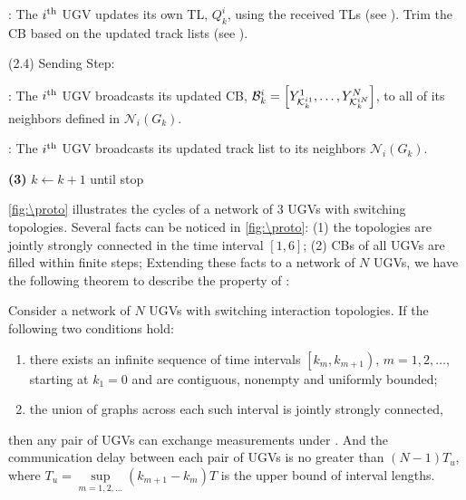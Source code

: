 \begin{algorithm}
\begin{algorithmic}
			\TL: The $i^\text{th}$ UGV updates its own TL, $Q^i_k$, using the received TLs (see ).
			Trim the CB based on the updated track lists (see ). 
			
			\State (2.4) Sending Step:
			
			\CB: The $i^\text{th}$ UGV broadcasts its updated CB, \small$\mathcal{B}^i_k=\left[Y^1_{\mathcal{K}^{i1}_{k}},\dots,Y^N_{\mathcal{K}^{iN}_{k}}\right]$\normalsize, to all of its neighbors defined in $\mathcal{N}_i(G_k)$.
			
			\TL: The $i^\text{th}$ UGV broadcasts its updated track list to its neighbors $\mathcal{N}_i(G_k)$.
			
			\State \textbf{(3)} $k\leftarrow k+1$ until stop
		\end{algorithmic}
	\end{algorithm}
	
	\cref{fig:\proto} illustrates the {\proto} cycles of a network of 3 UGVs with switching topologies.
	Several facts can be noticed in \cref{fig:\proto}: 
	(1) the topologies are jointly strongly connected in the time interval $\left[1,6\right]$;
	(2) CBs of all UGVs are filled within finite steps;
	Extending these facts to a network of $N$ UGVs, we have the following theorem to describe the property of \proto:
	
	\begin{thm}\label{prop1}
		Consider a network of $N$ UGVs with switching interaction topologies.
		If the following two conditions hold:
		\begin{enumerate}
			\item there exists an infinite sequence of time intervals $\left[k_m,k_{m+1} \right),\,m=1,2,\dots$, starting at $k_1=0$ and are contiguous, nonempty and uniformly bounded;
			\item the union of graphs across each such interval is jointly strongly connected,
		\end{enumerate}
		then any pair of UGVs can exchange measurements under \proto. And the communication delay between each pair of UGVs is no greater than \small$(N-1)T_u$\normalsize, where \small$T_u=\sup\limits_{m=1,2,\dots}\left( k_{m+1}-k_m\right) T$ \normalsize is the upper bound of interval lengths.
	\end{thm}
	
